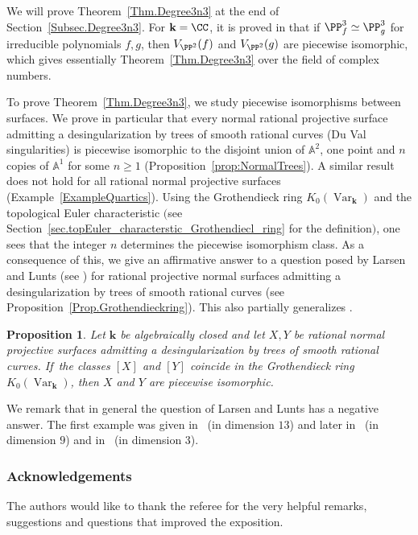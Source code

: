 \documentclass[JEP,XML,SOM,Unicode,NoFloatCountersInSection,published]{cedram}
\newtheorem{mainprop}[maintheorem]{Proposition}
\theoremstyle{definition}
\newcommand\A{{\mathbb A}}\let\AA\A
\renewcommand\k{{\mathbf k}}
\newcommand{\kk}{\mathbf{k}}
\DeclareMathOperator{\Var}{Var}
\begin{document}
We will prove Theorem~\ref{Thm.Degree3n3} at the end of Section~\ref{Subsec.Degree3n3}. For $\kk = \CC$,
it is proved in \cite{LaSe2012Birational-self-ma} that if $\PP^3_f \simeq \PP^3_g$ for irreducible polynomials $f, g$,
then $V_{\PP^2}(f)$ and $V_{\PP^2}(g)$ are piecewise isomorphic, which gives essentially Theorem~\ref{Thm.Degree3n3} over the field of complex numbers.

To prove Theorem~\ref{Thm.Degree3n3}, we study piecewise isomorphisms between surfaces. We prove in particular that every normal rational projective surface admitting a desingularization by trees of smooth rational curves (\eg Du Val singularities) is piecewise isomorphic to the disjoint union of $\A^2$, one point and $n$ copies of $\A^1$ for some $n\ge 1$ (Proposition~\ref{prop:NormalTrees}). A similar result does not hold for all rational normal projective surfaces (Example~\ref{ExampleQuartics}). Using the Grothendieck ring $K_0(\Var_\k)$ and the topological Euler characteristic $($see Section~\ref{sec.topEuler_characterstic_Grothendiecl_ring} for the definition$)$, one sees that the integer $n$ determines the piecewise isomorphism class. As a consequence of this, we give an affir\-mative answer to a question
posed by Larsen and Lunts (see \cite[Quest.\,1.2]{LaLu2003Motivic-measures-a})
for rational projective normal surfaces admitting a desingularization by trees of smooth rational curves
(see Proposition~\ref{Prop.Grothendieckring}).
This also partially generalizes \cite[Th.\,4]{LiSe2010The-Grothendieck-r}.

\begin{mainprop}
Let $\kk$ be algebraically closed and let $X, Y$ be rational
normal projective surfaces admitting a desingularization by trees of smooth rational curves.
If~the classes $[X]$ and $[Y]$ coincide in the Grothendieck ring
$K_0(\Var_\k)$, then $X$ and $Y$ are piecewise isomorphic.
\end{mainprop}

We remark that in general the question of Larsen and Lunts
has a negative answer. The first example was given
in~\cite[Th.\,2.14]{Bo2018The-class-of-the-a} (in dimension $13$) and later
in~\cite[Th.\,1.1]{Ma2016The-class-of-the-a} (in dimension $9$) and
in~\cite[Th.\,1.9]{KuSh2018Grothendieck-ring-} (in dimension $3$).

\subsubsection*{Acknowledgements}
The authors would like to thank the referee for the very helpful remarks,
suggestions and questions that improved the exposition.
\end{document}
